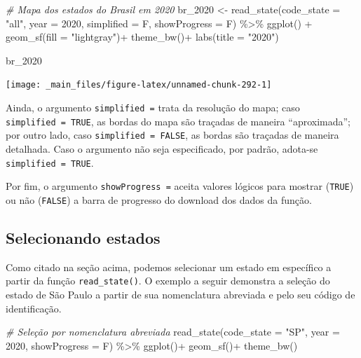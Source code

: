 \documentclass[
  brazilian,
]{book}
\newenvironment{Shaded}{\begin{snugshade}}{\end{snugshade}}
\newcommand{\AttributeTok}[1]{\textcolor[rgb]{0.77,0.63,0.00}{#1}}
\newcommand{\CommentTok}[1]{\textcolor[rgb]{0.56,0.35,0.01}{\textit{#1}}}
\newcommand{\DecValTok}[1]{\textcolor[rgb]{0.00,0.00,0.81}{#1}}
\newcommand{\FunctionTok}[1]{\textcolor[rgb]{0.00,0.00,0.00}{#1}}
\newcommand{\NormalTok}[1]{#1}
\newcommand{\OtherTok}[1]{\textcolor[rgb]{0.56,0.35,0.01}{#1}}
\newcommand{\SpecialCharTok}[1]{\textcolor[rgb]{0.00,0.00,0.00}{#1}}
\newcommand{\StringTok}[1]{\textcolor[rgb]{0.31,0.60,0.02}{#1}}
\begin{document}
\begin{Shaded}
\begin{Highlighting}[]
\CommentTok{\# Mapa dos estados do Brasil em 2020}
\NormalTok{br\_2020 }\OtherTok{\textless{}{-}} \FunctionTok{read\_state}\NormalTok{(}\AttributeTok{code\_state =} \StringTok{"all"}\NormalTok{,}
                      \AttributeTok{year =} \DecValTok{2020}\NormalTok{,}
                      \AttributeTok{simplified =}\NormalTok{ F,}
                      \AttributeTok{showProgress =}\NormalTok{ F) }\SpecialCharTok{\%\textgreater{}\%}
  \FunctionTok{ggplot}\NormalTok{() }\SpecialCharTok{+} 
  \FunctionTok{geom\_sf}\NormalTok{(}\AttributeTok{fill =} \StringTok{"lightgray"}\NormalTok{)}\SpecialCharTok{+}
  \FunctionTok{theme\_bw}\NormalTok{()}\SpecialCharTok{+}
  \FunctionTok{labs}\NormalTok{(}\AttributeTok{title =} \StringTok{"2020"}\NormalTok{)}

\NormalTok{br\_2020}
\end{Highlighting}
\end{Shaded}

\begin{center}\texttt{[image: \_main\_files/figure-latex/unnamed-chunk-292-1]} \end{center}

Ainda, o argumento \texttt{simplified\ =} trata da resolução do mapa; caso \texttt{simplified\ =\ TRUE}, as bordas do mapa são traçadas de maneira ``aproximada''; por outro lado, caso \texttt{simplified\ =\ FALSE}, as bordas são traçadas de maneira detalhada. Caso o argumento não seja especificado, por padrão, adota-se \texttt{simplified\ =\ TRUE}.

Por fim, o argumento \texttt{showProgress\ =} aceita valores lógicos para mostrar (\texttt{TRUE}) ou não (\texttt{FALSE}) a barra de progresso do download dos dados da função.

\hypertarget{estad}{%
\subsection{Selecionando estados}\label{estad}}

Como citado na seção acima, podemos selecionar um estado em específico a partir da função \texttt{read\_state()}. O exemplo a seguir demonstra a seleção do estado de São Paulo a partir de sua nomenclatura abreviada e pelo seu código de identificação.

\begin{Shaded}
\begin{Highlighting}[]
\CommentTok{\# Seleção por nomenclatura abreviada}
\FunctionTok{read\_state}\NormalTok{(}\AttributeTok{code\_state =} \StringTok{"SP"}\NormalTok{,}
           \AttributeTok{year =} \DecValTok{2020}\NormalTok{,}
           \AttributeTok{showProgress =}\NormalTok{ F) }\SpecialCharTok{\%\textgreater{}\%} 
  \FunctionTok{ggplot}\NormalTok{()}\SpecialCharTok{+}
  \FunctionTok{geom\_sf}\NormalTok{()}\SpecialCharTok{+}
  \FunctionTok{theme\_bw}\NormalTok{()}
\end{Highlighting}
\end{Shaded}
\end{document}
